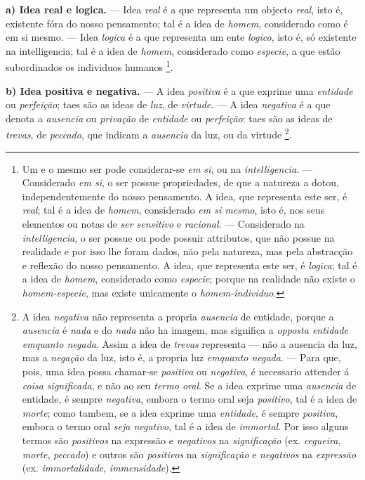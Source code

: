 \textbf{a) Idea real e logica.} --- Idea \emph{real} é a que representa um objecto \emph{real}, isto é, existente fóra do nosso pensamento; tal é a idea de \emph{homem}, considerado como é em si mesmo. --- Idea \emph{logica} é a que representa um ente \emph{logico}, isto é, só existente na intelligencia; tal é a idea de \emph{homem}, considerado como \emph{especie}, a que estão subordinados os individuos humanos \footnote{Um e o mesmo ser pode considerar-se \emph{em si}, ou na \emph{intelligencia}. --- Considerado \emph{em si}, o ser possue propriedades, de que a natureza a dotou, independentemente do nosso pensamento. A idea, que representa este ser, é \emph{real}; tal é a idea de \emph{homem}, considerado \emph{em si mesmo}, isto é, nos seus elementos ou notas de \emph{ser sensitivo} e \emph{racional}. --- Considerado na \emph{intelligencia}, o ser possue ou pode possuir attributos, que não possue na realidade e por isso lhe foram dados, não pela natureza, mas pela abstracção e reflexão do nosso pensamento. A idea, que representa este ser, é \emph{logica}; tal é a idea de \emph{homem}, considerado como \emph{especie}; porque na realidade não existe o \emph{homem-especie}, mas existe unicamente o \emph{homem-individuo}.}.

\textbf{b) Idea positiva e negativa.} --- A idea \emph{positiva} é a que exprime uma \emph{entidade} ou \emph{perfeição}; taes são as ideas de \emph{luz}, de \emph{virtude}. --- A idea \emph{negativa} é a que denota a \emph{ausencia} ou \emph{privação} de \emph{entidade} ou \emph{perfeição}: taes são as ideas de \emph{trevas}, de \emph{peccado}, que indicam a \emph{ausencia} da luz, ou da virtude \footnote{A idea \emph{negativa} não representa a propria \emph{ausencia} de entidade, porque a \emph{ausencia} é \emph{nada} e do \emph{nada} não ha imagem, mas significa a \emph{opposta entidade emquanto negada}. Assim a idea de \emph{trevas} representa --- não a ausencia da luz, mas a \emph{negação} da luz, isto é, a propria luz \emph{emquanto negada}. --- Para que, pois, uma idea possa chamar-se \emph{positiva} ou \emph{negativa}, é necessario attender á \emph{coisa significada}, e não ao seu \emph{termo oral}. Se a idea exprime uma \emph{ausencia} de entidade, é sempre \emph{negativa}, embora o termo oral seja \emph{positivo}, tal é a idea de \emph{morte}; como tambem, se a idea exprime uma \emph{entidade}, é sempre \emph{positiva}, embora o termo oral \emph{seja negativo}, tal é a idea de \emph{immortal}. Por isso alguns termos são \emph{positivos} na expressão e \emph{negativos} na \emph{significação} (ex. \emph{cegueira}, \emph{morte}, \emph{peccado}) e outros são \emph{positivos} na \emph{significação} e \emph{negativos} na \emph{expressão} (ex. \emph{immortalidade}, \emph{immensidade}).}.

